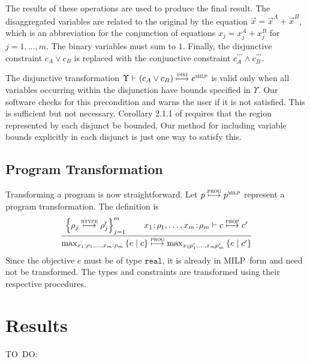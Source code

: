 \documentclass[preprint]{sigplanconf}%
\theoremstyle{remark}
\begin{document}
The results of these operations are used to produce the final result. The
disaggregated variables are related to the original by the equation $\vec
{x}=\vec{x}^{A}+\vec{x}^{B}$, which is an abbreviation for the conjunction of
equations $x_{j}=x_{j}^{A}+x_{j}^{B}$ for $j=1,\ldots,m$. The binary variables
must sum to $1$. Finally, the disjunctive constraint $c_{A}\vee c_{B}$ is
replaced with the conjunctive constraint $c_{A}^{\prime\prime\prime}\wedge
c_{B}^{\prime\prime\prime}$.

The disjunctive transformation $\Upsilon\vdash\left(  c_{A}\vee c_{B}\right)
\overset{\text{\textsc{disj}}}{\longmapsto}c^{\textsc{milp}}$ is valid only
when all variables occurring within the disjunction have bounds specified in
$\Upsilon$. Our software checks for this precondition and warns the user if it
is not satisfied. This is sufficient but not necessary. Corollary 2.1.1 of
\cite{Balas1974} requires that the region represented by each disjunct be
bounded. Our method for including variable bounds explicitly in each disjunct
is just one way to satisfy this.

\subsection{Program Transformation}

Transforming a program is now straightforward. Let $p\overset
{\text{\textsc{prog}}}{\longmapsto}p^{\textsc{milp}}$ represent a program
transformation. The definition is%
\begin{equation}
\frac{\left\{  \rho_{j}\overset{\text{\textsc{rtype}}}{\longmapsto}\rho
_{j}^{\prime}\right\}  _{j=1}^{m}\qquad x_{1}\!:\!\rho_{1},\ldots
,x_{m}\!:\!\rho_{m}\vdash c\overset{\text{\textsc{prop}}}{\longmapsto
}c^{\prime}}{\mathrm{max}_{x_{1}:\rho_{1},\ldots,x_{m}:\rho_{m}}\left\{  e\mid
c\right\}  \overset{\text{\textsc{prog}}}{\longmapsto}\mathrm{max}%
_{x_{1}\!:\!\rho_{1}^{\prime},\ldots,x_{m}\!:\!\rho_{m}^{\prime}}\left\{
e\mid c^{\prime}\right\}  }\label{prog_compiler}%
\end{equation}
Since the objective $e$ must be of type $\mathtt{real}$, it is already in
MILP\ form and need not be transformed. The types and constraints are
transformed using their respective procedures.

\section{Results}

TO\ DO:
\end{document}
